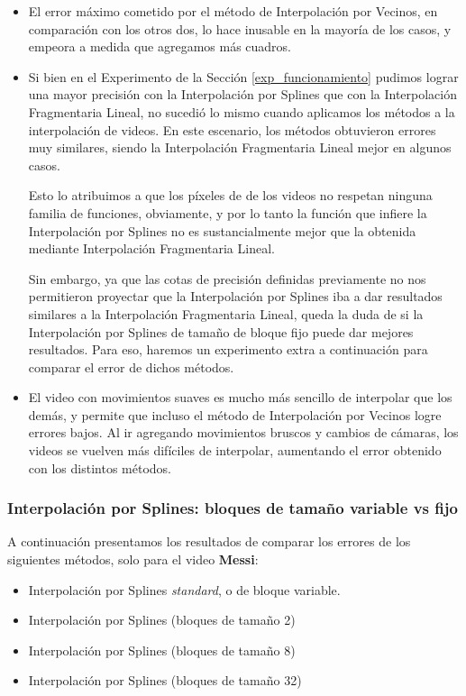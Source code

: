 \begin{itemize}
    \item El error máximo cometido por el método de Interpolación por Vecinos, en comparación
        con los otros dos, lo hace inusable en la mayoría de los casos, y empeora a medida
        que agregamos más cuadros.
    \item Si bien en el Experimento de la Sección \ref{exp_funcionamiento} pudimos lograr una
        mayor precisión con la Interpolación por Splines que con la Interpolación Fragmentaria Lineal,
        no sucedió lo mismo cuando aplicamos los métodos a la interpolación de videos.
        En este escenario, los métodos obtuvieron errores muy similares, siendo la Interpolación
        Fragmentaria Lineal mejor en algunos casos.

        Esto lo atribuimos a que los píxeles de de los videos no respetan ninguna familia de funciones,
        obviamente, y por lo tanto la función que infiere la Interpolación por Splines
        no es sustancialmente mejor que la obtenida mediante Interpolación Fragmentaria Lineal.

        Sin embargo, ya que las cotas de precisión definidas previamente no nos permitieron
        proyectar que la Interpolación por Splines iba a dar resultados similares a la
        Interpolación Fragmentaria Lineal, queda la duda de si la Interpolación por Splines
        de tamaño de bloque fijo puede dar mejores resultados. Para eso, haremos un
        experimento extra a continuación para comparar el error de dichos métodos.
    \item El video con movimientos suaves es mucho más sencillo de interpolar que los demás, y
        permite que incluso el método de Interpolación por Vecinos logre errores bajos.
        Al ir agregando movimientos bruscos y cambios de cámaras, los videos se vuelven más
        difíciles de interpolar, aumentando el error obtenido con los distintos métodos.
\end{itemize}

\subsubsection{Interpolación por Splines: bloques de tamaño variable vs fijo}

A continuación presentamos los resultados de comparar los errores de los siguientes métodos, solo para el video \textbf{Messi}:
\begin{itemize}
    \item Interpolación por Splines \textit{standard}, o de bloque variable.
    \item Interpolación por Splines (bloques de tamaño 2)
    \item Interpolación por Splines (bloques de tamaño 8)
    \item Interpolación por Splines (bloques de tamaño 32)
\end{itemize}


